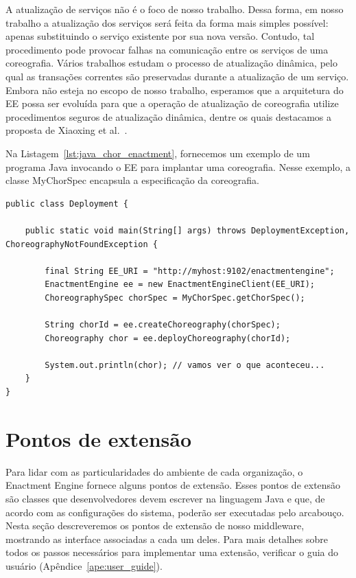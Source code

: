 \begin{description}
A atualização de serviços não é o foco de nosso trabalho.
Dessa forma, em nosso trabalho a atualização dos serviços será feita da forma mais simples possível: 
apenas substituindo o serviço existente por sua nova versão. 
Contudo, tal procedimento pode provocar falhas na comunicação entre os serviços de uma coreografia. 
Vários trabalhos \cite{Kramer1990Philosophers, Vandewoude2007Tranquility, Xiaoxing2011VersionConsistent} 
estudam o processo de atualização dinâmica, pelo qual as transações correntes 
são preservadas durante a atualização de um serviço. 
Embora não esteja no escopo de nosso trabalho, esperamos que a arquitetura do EE possa ser 
evoluída para que a operação de atualização de coreografia utilize procedimentos seguros de 
atualização dinâmica, dentre os quais destacamos a proposta de Xiaoxing et al.~\cite{Xiaoxing2011VersionConsistent}.

\end{description}

Na Listagem~\ref{lst:java_chor_enactment}, fornecemos um exemplo de 
um programa Java invocando o EE para implantar uma coreografia.
Nesse exemplo, a classe \textsf{MyChorSpec} encapsula a 
especificação da coreografia.

\begin{lstlisting}[breaklines, caption={Programa Java que invoca o \ee para implantar uma coreografia.}, label={lst:java_chor_enactment}]
public class Deployment {

    public static void main(String[] args) throws DeploymentException, ChoreographyNotFoundException {

        final String EE_URI = "http://myhost:9102/enactmentengine";
        EnactmentEngine ee = new EnactmentEngineClient(EE_URI);
        ChoreographySpec chorSpec = MyChorSpec.getChorSpec();

        String chorId = ee.createChoreography(chorSpec);
        Choreography chor = ee.deployChoreography(chorId);

        System.out.println(chor); // vamos ver o que aconteceu...
    }
}
\end{lstlisting}


\section{Pontos de extensão}
\label{sec:extensao}

Para lidar com as particularidades do ambiente de cada organização, o Enactment Engine fornece alguns pontos de extensão. Esses pontos de extensão são classes que desenvolvedores devem escrever na linguagem Java e que, de acordo com as configurações do sistema, poderão ser executadas pelo arcabouço.
Nesta seção descreveremos os pontos de extensão de nosso middleware, 
mostrando as interface associadas a cada um deles.
Para mais detalhes sobre todos os passos necessários para implementar
uma extensão, verificar o guia do usuário (Apêndice~\ref{ape:user_guide}).

